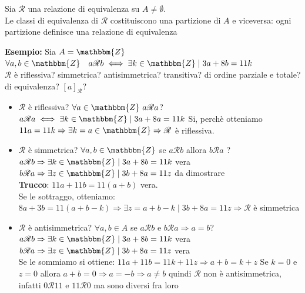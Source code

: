\documentclass[12pt, letterpaper]{report}
\newcounter{theorem}
\begin{document}
		\begin{theorem}{}{}
			Sia $\mathscr{R}$ una relazione di equivalenza su $A \neq \emptyset$. \\
			Le classi di equivalenza di $\mathscr{R}$ costituiscono una partizione di $A$ e viceversa: ogni partizione definisce una relazione di equivalenza
		\end{theorem}
		\textbf{Esempio:} Sia $A = \mathbbm{Z}$ \\
		$\forall a, b \in \mathbbm{Z} \quad a \mathscr{R} b \iff \exists k \in \mathbbm{Z} \mid 3a + 8b = 11k$ \\
		$\mathscr{R}$ è riflessiva? simmetrica? antisimmetrica? transitiva? di ordine parziale e totale? di equivalenza? $[a]_\mathscr{R}$?
		 \\
		\begin{itemize}
		\item $\mathscr{R}$ è riflessiva? $\forall a \in \mathbbm{Z}\ a \mathscr{R} a$? \\
			$a \mathscr{R} a \iff \exists k \in \mathbbm{Z} \mid 3a + 8a = 11k$ Si, perchè otteniamo $11a = 11k \Rightarrow \exists k = a \in \mathbbm{Z} \Rightarrow \mathscr{R}$ è riflessiva.
			\item $\mathscr{R}$ è simmetrica? $\forall a,b \in \mathbbm{Z}$ se $a \mathscr{R} b$ allora $b \mathscr{R} a$ ? \\
			$a \mathscr{R} b \Rightarrow \exists k \in \mathbbm{Z} \mid 3a + 8b = 11k$ vera\\
			$b \mathscr{R} a \Rightarrow \exists z \in \mathbbm{Z} \mid 3b + 8a = 11z$ da dimostrare\\
			\textbf{Trucco}: $11a + 11b = 11(a + b)$ vera. \\
			Se le sottraggo, otteniamo: $8a + 3b = 11(a + b - k) \Rightarrow \exists z = a + b - k \mid 3b + 8a = 11z \Rightarrow \mathscr{R}$ è simmetrica
			\item $\mathscr{R}$ è antisimmetrica? $\forall a,b \in A$ se $a \mathscr{R} b$ e $b \mathscr{R} a \Rightarrow a = b$? \\
			$a \mathscr{R} b \Rightarrow \exists k \in \mathbbm{Z} \mid 3a + 8b = 11k$ vera\\
			$b \mathscr{R} a \Rightarrow \exists z \in \mathbbm{Z} \mid 3b + 8a = 11z$ vera \\
			Se le sommiamo si ottiene: $11a + 11b = 11k + 11z \Rightarrow a + b = k + z$ Se $k = 0$ e $z = 0$ allora $a + b = 0 \Rightarrow a = -b \Rightarrow a \neq b$ quindi $\mathscr{R}$ non è antisimmetrica, infatti $0 \mathscr{R} 11$ e $11 \mathscr{R} 0$ ma sono diversi fra loro

\end{itemize}
\end{document}
